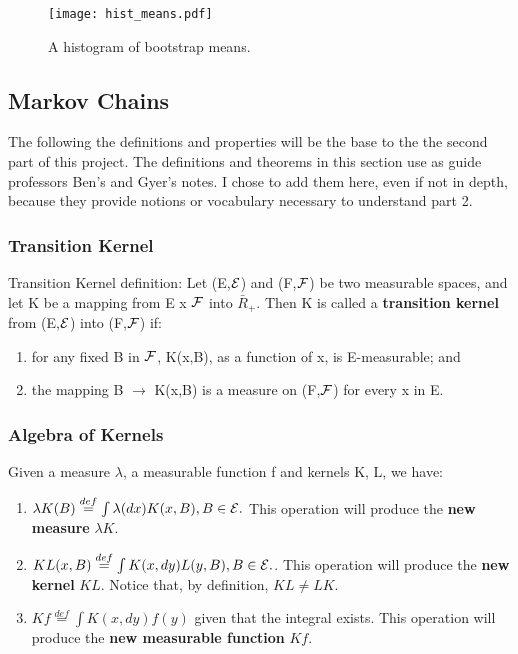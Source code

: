 \newpage

\begin{figure}
  \centering
	\texttt{[image: hist\_means.pdf]}
	  \caption{A histogram of bootstrap means.}
\end{figure}




\subsection{Markov Chains}

The following the definitions and properties will be the base to the the second part of this project. The definitions and theorems in this section use as guide professors Ben's and Gyer's notes. I chose to add them here, even if not in depth, because they provide notions or vocabulary necessary to understand part 2.

\subsubsection{Transition Kernel}\label{kernel_section}

Transition Kernel definition: Let (E,$\mathcal{E}$) and (F,$\mathcal{F}$) be two measurable spaces, and let K be a mapping from E x $\mathcal{F}$ into $\bar{R}_+$. Then K is called a\textbf{ transition kernel} from (E,$\mathcal{E}$) into (F,$\mathcal{F}$) if:

\begin{enumerate}[label=\alph*)]
\item for any fixed B in $\mathcal{F}$, K(x,B), as a function of x, is E-measurable; and

\item\label{prob_meas} the mapping B $\rightarrow$ K(x,B) is a measure on (F,$\mathcal{F}$) for every x in E.
\end{enumerate}

\subsubsection{Algebra of Kernels}\label{alg_kernels}
Given a measure $\lambda$, a measurable function f and kernels K, L, we have:

\begin{enumerate}[label=\alph*)]
\item$ \lambda K (B)  \overset{def}{=} \int \lambda(dx)K(x, B), B \in \mathcal{E}.$ This operation will produce the \textbf{new measure} $\lambda K$.

\item$KL(x, B) \overset{def}{=} \int K(x, dy)L(y, B), B \in \mathcal{E}.$. This operation will produce the \textbf{new kernel} $KL$. Notice that, by definition, $KL \neq LK$.
 
\item$Kf \overset{def}{=} \int K(x, dy)f(y)$ given that the integral exists. This operation will produce the \textbf{new measurable function} $Kf$. 

\end{enumerate}

